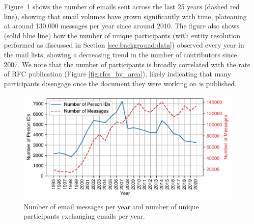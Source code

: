 \documentclass[twocolumn,10pt]{article}
\newlength{\figureWidthOneColumn}
\newcommand{\pb}[1]{\vspace{0.75ex}\noindent{\textbf{#1}}}
\begin{document}
\pb{Volume of Discussion:}
Figure~\ref{fig:pid_count_emailing_yearly} shows the number of emails sent
across the last 25 years (dashed red line), showing that email volumes have
grown significantly with time, plateauing at around 130,000 messages per
year since around 2010. The figure also shows (solid blue line) how the
number of unique participants (with entity resolution performed as
discussed in Section \ref{sec:background:data}) observed every year in the
mail lists, showing a decreasing trend in the number of contributors since
2007. We note that the number of participants is broadly correlated
with the rate of RFC publication (Figure \ref{fig:rfcs_by_area}), likely
indicating that many participants disengage once the document they were
working on is published.

\begin{figure}
  \centering
  \includegraphics[width=\figureWidthOneColumn]{figures-prev/imc-2021/emails/pid_count_emailing_yearly.pdf}
  \caption{
    Number of email messages per year and number of unique participants
    exchanging emails per year.
  }
  \label{fig:pid_count_emailing_yearly}
\end{figure}
\end{document}
